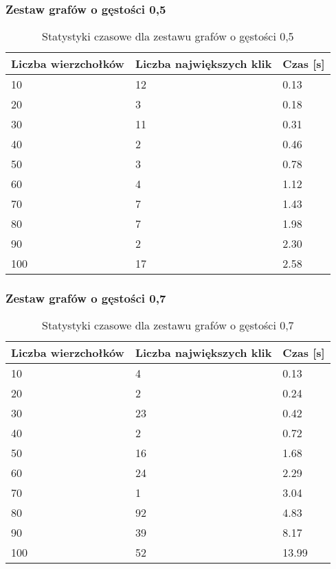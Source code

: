 \documentclass[12pt, a4paper]{article}
\begin{document}
\subsubsection*{Zestaw grafów o gęstości 0,5}
\begin{table}[H]
\caption{Statystyki czasowe dla zestawu grafów o gęstości 0,5}
\begin{center}
    \begin{tabular}{|l|l|l|}
    \hline
    Liczba wierzchołków & Liczba największych klik & Czas [s] \\ \hline
    10 & 12 & 0.13 \\ \hline
    20 & 3 & 0.18 \\ \hline
    30 & 11 & 0.31 \\ \hline
    40 & 2 & 0.46 \\ \hline
    50 & 3 & 0.78 \\ \hline
    60 & 4 & 1.12 \\ \hline
    70 & 7 & 1.43 \\ \hline
    80 & 7 & 1.98 \\ \hline
    90 & 2 & 2.30 \\ \hline
    100 & 17 & 2.58 \\ \hline
    \end{tabular}
\end{center}
\end{table}
\subsubsection*{Zestaw grafów o gęstości 0,7}
\begin{table}[H]
\caption{Statystyki czasowe dla zestawu grafów o gęstości 0,7}
\begin{center}
    \begin{tabular}{|l|l|l|}
    \hline
    Liczba wierzchołków & Liczba największych klik & Czas [s] \\ \hline
    10 & 4 & 0.13 \\ \hline
    20 & 2 & 0.24 \\ \hline
    30 & 23 & 0.42 \\ \hline
    40 & 2 & 0.72 \\ \hline
    50 & 16 & 1.68 \\ \hline
    60 & 24 & 2.29 \\ \hline
    70 & 1 & 3.04 \\ \hline
    80 & 92 & 4.83 \\ \hline
    90 & 39 & 8.17 \\ \hline
    100 & 52 & 13.99 \\ \hline
    \end{tabular}
\end{center}
\end{table}
\end{document}
